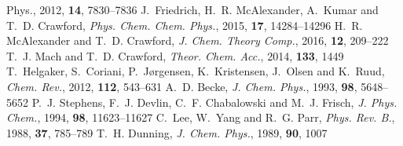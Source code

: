 \documentclass[11pt,article]{achemso}
\begin{document}
\begin{mcitethebibliography}{41}
{  Phys.}, 2012, \textbf{14}, 7830--7836\relax
\mciteBstWouldAddEndPuncttrue
\mciteSetBstMidEndSepPunct{\mcitedefaultmidpunct}
{\mcitedefaultendpunct}{\mcitedefaultseppunct}\relax
\EndOfBibitem
{}
J.~Friedrich, H.~R. McAlexander, A.~Kumar and T.~D. Crawford, \emph{Phys. Chem.
  Chem. Phys.}, 2015, \textbf{17}, 14284--14296\relax
\mciteBstWouldAddEndPuncttrue
\mciteSetBstMidEndSepPunct{\mcitedefaultmidpunct}
{\mcitedefaultendpunct}{\mcitedefaultseppunct}\relax
\EndOfBibitem
{}
H.~R. McAlexander and T.~D. Crawford, \emph{J. Chem. Theory Comp.}, 2016,
  \textbf{12}, 209--222\relax
\mciteBstWouldAddEndPuncttrue
\mciteSetBstMidEndSepPunct{\mcitedefaultmidpunct}
{\mcitedefaultendpunct}{\mcitedefaultseppunct}\relax
\EndOfBibitem
{}
T.~J. Mach and T.~D. Crawford, \emph{Theor. Chem. Acc.}, 2014, \textbf{133},
  1449\relax
\mciteBstWouldAddEndPuncttrue
\mciteSetBstMidEndSepPunct{\mcitedefaultmidpunct}
{\mcitedefaultendpunct}{\mcitedefaultseppunct}\relax
\EndOfBibitem
{}
T.~Helgaker, S.~Coriani, P.~J{\o}rgensen, K.~Kristensen, J.~Olsen and K.~Ruud,
  \emph{Chem. Rev.}, 2012, \textbf{112}, 543--631\relax
\mciteBstWouldAddEndPuncttrue
\mciteSetBstMidEndSepPunct{\mcitedefaultmidpunct}
{\mcitedefaultendpunct}{\mcitedefaultseppunct}\relax
\EndOfBibitem
{}
A.~D. Becke, \emph{J. Chem. Phys.}, 1993, \textbf{98}, 5648--5652\relax
\mciteBstWouldAddEndPuncttrue
\mciteSetBstMidEndSepPunct{\mcitedefaultmidpunct}
{\mcitedefaultendpunct}{\mcitedefaultseppunct}\relax
\EndOfBibitem
{}
P.~J. Stephens, F.~J. Devlin, C.~F. Chabalowski and M.~J. Frisch, \emph{J.
  Phys. Chem.}, 1994, \textbf{98}, 11623--11627\relax
\mciteBstWouldAddEndPuncttrue
\mciteSetBstMidEndSepPunct{\mcitedefaultmidpunct}
{\mcitedefaultendpunct}{\mcitedefaultseppunct}\relax
\EndOfBibitem
{}
C.~Lee, W.~Yang and R.~G. Parr, \emph{Phys. Rev. B.}, 1988, \textbf{37},
  785--789\relax
\mciteBstWouldAddEndPuncttrue
\mciteSetBstMidEndSepPunct{\mcitedefaultmidpunct}
{\mcitedefaultendpunct}{\mcitedefaultseppunct}\relax
\EndOfBibitem
{}
T.~H. Dunning, \emph{J. Chem. Phys.}, 1989, \textbf{90}, 1007\relax
\mciteBstWouldAddEndPuncttrue

\end{mcitethebibliography}
\end{document}
